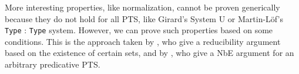 More interesting properties, like normalization, cannot be proven generically because they do not hold for all \ac{PTS}, like Girard's System U or Martin-L{\"o}f's \texttt{Type} : \texttt{Type} system.
However, we can prove such properties based on some conditions.
This is the approach taken by \citet{MW96}, who give a reducibility argument based on the existence of certain sets,
  and by \citet{FP15}, who give a \ac{NbE} argument for an arbitrary predicative \ac{PTS}.
